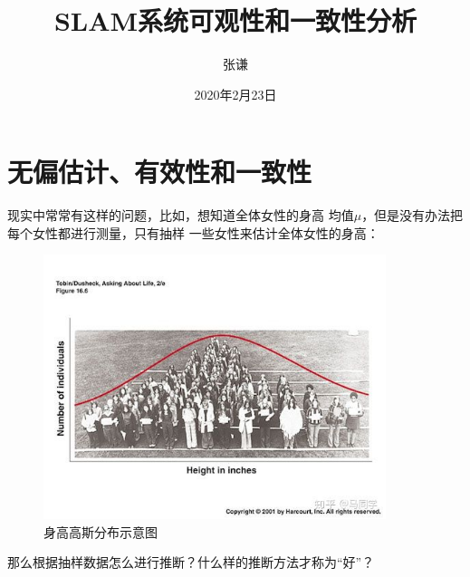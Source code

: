 \documentclass{article}
\title{SLAM系统可观性和一致性分析}
\author{张谦}
\date{2020年2月23日}
\begin{document}
\maketitle
\section{无偏估计、有效性和一致性}
现实中常常有这样的问题，比如，想知道全体女性的身高
均值$\mu$，但是没有办法把每个女性都进行测量，只有抽样
一些女性来估计全体女性的身高：
\begin{figure}[htbp]
    \centering
    \includegraphics[width=10cm]{figure1.jpg}
    \caption{身高高斯分布示意图}
\end{figure}

那么根据抽样数据怎么进行推断？什么样的推断方法才称为“好”？
\end{document}
